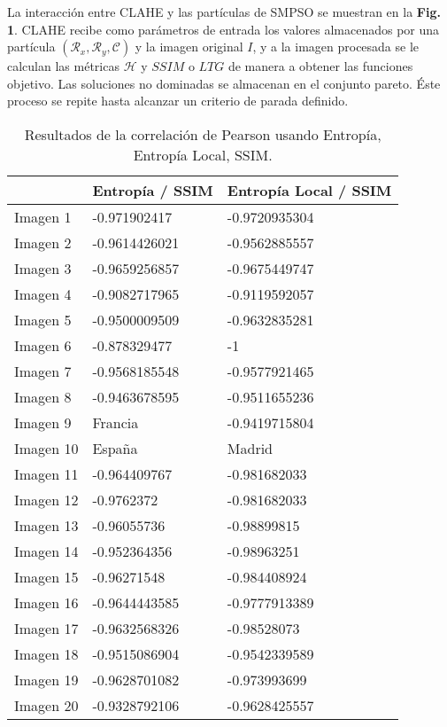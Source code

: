 \documentclass[spanish,twocolumn]{article}
\begin{document}
{La interacción entre CLAHE y las partículas de SMPSO se muestran en la \textbf {Fig. 1}. CLAHE recibe como parámetros de entrada los valores almacenados por una partícula $(\mathcal{R}_x,\mathcal{R}_y, \mathscr{C})$ y la imagen original $I$, y a la imagen procesada se le calculan las métricas $\mathscr{H}$ y $SSIM$  o $LTG$ de manera a obtener las funciones objetivo. Las soluciones no dominadas se almacenan en el conjunto pareto. Éste proceso se repite hasta alcanzar un criterio de parada definido.

\begin{table}[htbp]
\begin{center}
\begin{tabular}{|l|l|l|}
\hline
& Entropía / SSIM & Entropía Local / SSIM\\
\hline \hline
Imagen 1 & -0.971902417 & -0.9720935304 \\ \hline
Imagen 2 & -0.9614426021 & -0.9562885557 \\ \hline
Imagen 3 & -0.9659256857 & -0.9675449747 \\ \hline
Imagen 4 & -0.9082717965 & -0.9119592057 \\ \hline
Imagen 5 & -0.9500009509 & -0.9632835281 \\ \hline
Imagen 6 & -0.878329477 & -1 \\ \hline
Imagen 7 & -0.9568185548 & -0.9577921465 \\ \hline
Imagen 8 & -0.9463678595 & -0.9511655236 \\ \hline
Imagen 9 & Francia & -0.9419715804 \\ \hline
Imagen 10 & España & Madrid \\ \hline
Imagen 11 & -0.964409767 & -0.981682033 \\ \hline
Imagen 12 & -0.9762372 & -0.981682033 \\ \hline
Imagen 13 & -0.96055736 & -0.98899815 \\ \hline
Imagen 14 & -0.952364356 & -0.98963251 \\ \hline
Imagen 15 & -0.96271548 & -0.984408924 \\ \hline
Imagen 16 & -0.9644443585 & -0.9777913389 \\ \hline
Imagen 17 & -0.9632568326 & -0.98528073 \\ \hline
Imagen 18 & -0.9515086904 & -0.9542339589 \\ \hline
Imagen 19 & -0.9628701082 & -0.973993699 \\ \hline
Imagen 20 & -0.9328792106 & -0.9628425557 \\ \hline
\end{tabular}
\caption{Resultados de la correlación de Pearson usando Entropía, Entropía Local, SSIM.}
\label{tabla:correlacionSSIM}
\end{center}
\end{table}

}
\end{document}
